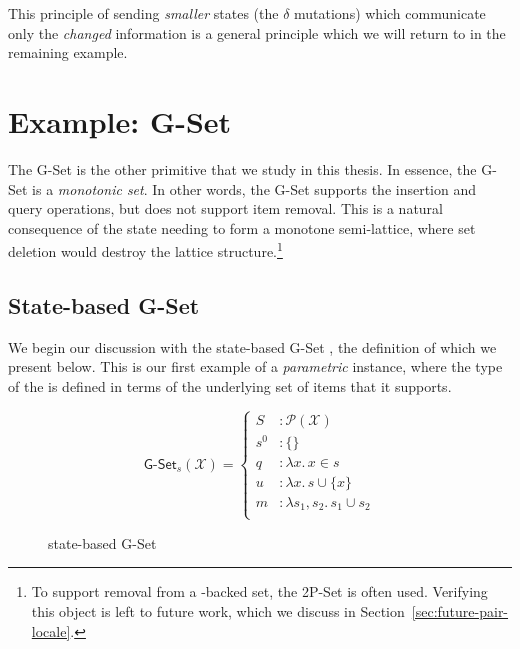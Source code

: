 This principle of sending \emph{smaller} states (the $\delta$ mutations) which
communicate only the \emph{changed} information is a general principle which
we will return to in the remaining example.

\section{Example: G-Set}
\label{sec:example-gset}

The G-Set is the other primitive \CRDT that we study in this thesis. In essence,
the G-Set is a \emph{monotonic set}. In other words, the G-Set supports the
insertion and query operations, but does not support item removal. This
is a natural consequence of the state needing to form a monotone semi-lattice,
where set deletion would destroy the lattice structure.\footnote{To support
removal from a \CRDT-backed set, the 2P-Set is often used. Verifying this object
is left to future work, which we discuss in
Section~\ref{sec:future-pair-locale}.}

\subsection{State-based G-Set}

We begin our discussion with the state-based G-Set \CRDT, the definition of
which we present below. This is our first example of a \emph{parametric} \CRDT
instance, where the type of the \CRDT is defined in terms of the underlying set
of items that it supports.

\begin{figure}[H]
  \centering
  \[
    \textsf{G-Set}_s(\mathcal{X}) = \left\{\begin{aligned}
      S &: \mathcal{P}(\mathcal{X}) \\
      s^0 &: \{ \} \\
      q &: \lambda x.\, x \in s \\
      u &: \lambda x.\, s \cup \{ x \} \\
      m &: \lambda s_1, s_2.\, s_1 \cup s_2 \\
    \end{aligned}\right.
  \]
  \caption{state-based \textsf{G-Set} \CRDT}
  \label{fig:gset-state}
\end{figure}

